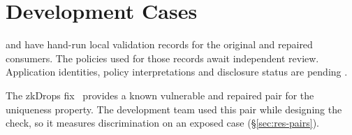 \section{Development Cases}\label{sec:cases}

\CaseA{} and \CaseB{} have hand-run local validation records for the original
and repaired consumers. The policies used for those records await independent
review. Application identities, policy interpretations and disclosure status
are pending .

The zkDrops fix~\cite{zkdrops-pr2} provides a known vulnerable and repaired
pair for the uniqueness property. The development team used this pair while
designing the check, so it measures discrimination on an exposed case
(\S\ref{sec:res-pairs}).
